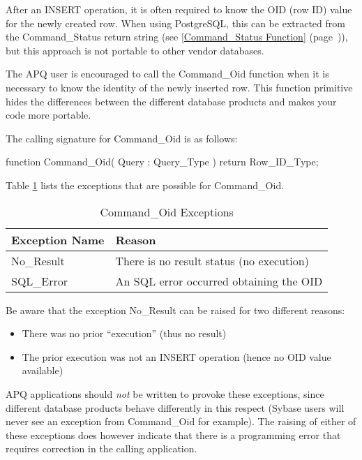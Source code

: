 \documentclass[english,letterpaper]{book}
\newcommand\Ref[1]{\textsection\ref{#1} (page~\pageref{#1})}
\begin{document}
After an INSERT operation, it is often required to know the OID (row ID)
value for the newly created row. When using PostgreSQL, this can be
extracted from the Command\_Status return string (see
\Ref{Command_Status Function}), but this approach is not
portable to other vendor databases.

The APQ user is encouraged to call the Command\_Oid function when
it is necessary to know the identity of the newly inserted row. This
function primitive hides the differences between the different database
products and makes your code more portable.

The calling signature for Command\_Oid is as follows:

\begin{Code}
function Command_Oid(
   Query : Query_Type
) return Row_ID_Type;
\end{Code}

Table \ref{t:coidx} lists the exceptions that are possible for Command\_Oid.

\begin{table}
   \begin{center}
      \begin{tabular}{ll}
         Exception Name    &  Reason\\
         \hline 
         No\_Result        &  There is no result status (no execution)\\
         SQL\_Error        &  An SQL error occurred obtaining the OID\\
      \end{tabular}
   \end{center}
   \caption{Command\_Oid Exceptions}\label{t:coidx}
\end{table}

Be aware that the exception No\_Result can be raised for two different
reasons:

\begin{itemize}
   \item There was no prior ``execution'' (thus no result)
   \item The prior execution was not an INSERT operation (hence no OID value available)
\end{itemize}

APQ applications should \emph{not} be written to provoke these exceptions,
since different database products behave differently in this respect
(Sybase users will never see an exception from Command\_Oid for example).
The raising of either of these exceptions does however indicate that
there is a programming error that requires correction in the calling
application.
\end{document}
